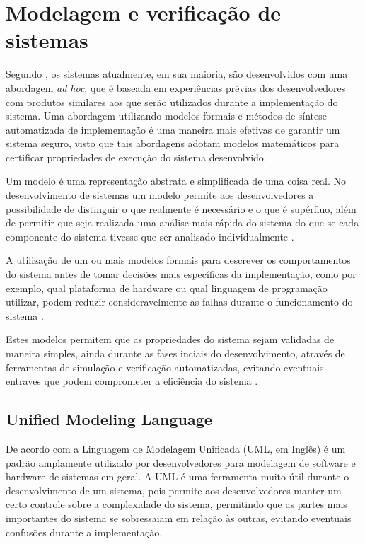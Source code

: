 

\section{Modelagem e verificação de sistemas}

Segundo , os sistemas atualmente, em sua maioria, são desenvolvidos com uma abordagem \textit{ad hoc}, que é baseada em experiências prévias dos desenvolvedores com produtos similares aos que serão utilizados durante a implementação do sistema. Uma abordagem utilizando modelos formais e métodos de síntese automatizada de implementação é uma maneira mais efetivas de garantir um sistema seguro, visto que tais abordagens adotam modelos matemáticos para certificar propriedades de execução do sistema desenvolvido. 

Um modelo é uma representação abstrata e simplificada de uma coisa real. No desenvolvimento de sistemas um modelo permite aos desenvolvedores a possibilidade de distinguir o que realmente é necessário e o que é supérfluo, além de permitir que seja realizada uma análise mais rápida do sistema do que se cada componente do sistema tivesse que ser analisado individualmente \cite{UML:2006}.

A utilização de um ou mais modelos formais para descrever os comportamentos do sistema antes de tomar decisões mais específicas da implementação, como por exemplo, qual plataforma de hardware ou qual linguagem de programação utilizar, podem reduzir consideravelmente as falhas durante o funcionamento do sistema \cite{edwards:1997}.

Estes modelos permitem que as propriedades do sistema sejam validadas de maneira simples, ainda durante as fases inciais do desenvolvimento, através de ferramentas de simulação e verificação automatizadas, evitando eventuais entraves que podem comprometer a eficiência do sistema \cite{edwards:1997}.

\subsection{Unified Modeling Language}

De acordo com  a Linguagem de Modelagem Unificada (UML, em Inglês) é um padrão amplamente utilizado por desenvolvedores para modelagem de software e hardware de sistemas em geral. A UML é uma ferramenta muito útil durante o desenvolvimento de um sistema, pois permite aos desenvolvedores manter um certo controle sobre a complexidade do sistema, permitindo que as partes mais importantes do sistema se sobressaiam em relação às outras, evitando eventuais confusões durante a implementação.

